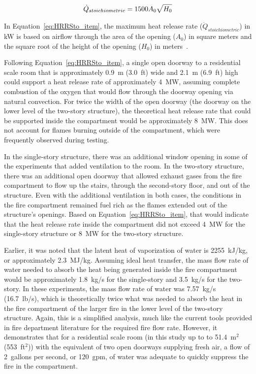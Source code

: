 \documentclass[12pt,oneside]{book}
\begin{document}
\begin{equation} \label{eq:HRRSto_item}
\dot{Q}_{stoichiometric} = 1500 A_0 \sqrt{H_0} \\
\end{equation}

In Equation~\ref{eq:HRRSto_item}, the maximum heat release rate ($\dot{Q}_{stoichiometric}$) in kW is based on airflow through the area of the opening ($A_0$) in square meters and the square root of the height of the opening ($H_0$) in meters~\cite{Babrauskas:4}.  

Following Equation~\ref{eq:HRRSto_item}, a single open doorway to a residential scale room that is approximately 0.9~m (3.0~ft) wide and 2.1~m (6.9~ft) high could support a heat release rate of approximately 4~MW, assuming complete combustion of the oxygen that would flow through the doorway opening via natural convection. For twice the width of the open doorway (the doorway on the lower level of the two-story structure), the theoretical heat release rate that could be supported inside the compartment would be approximately 8~MW. This does not account for flames burning outside of the compartment, which were frequently observed during testing.  

In the single-story structure, there was an additional window opening in some of the experiments that added ventilation to the room. In the two-story structure, there was an additional open doorway that allowed exhaust gases from the fire compartment to flow up the stairs, through the second-story floor, and out of the structure. Even with the additional ventilation in both cases, the conditions in the fire compartment remained fuel rich as the flames extended out of the structure's openings. Based on Equation~\ref{eq:HRRSto_item}, that would indicate that the heat release rate inside the compartment did not exceed 4~MW for the single-story structure or 8~MW for the two-story structure. 

Earlier, it was noted that the latent heat of vaporization of water is 2255~kJ/kg, or approximately 2.3~MJ/kg. Assuming ideal heat transfer, the mass flow rate of water needed to absorb the heat being generated inside the fire compartment would be approximately 1.8~kg/s for the single-story and 3.5~kg/s for the two-story. In these experiments, the mass flow rate of water was 7.57~kg/s (16.7~lb/s), which is theoretically twice what was needed to absorb the heat in the fire compartment of the larger fire in the lower level of the two-story structure. Again, this is a simplified analysis, much like the current tools provided in fire department literature for the required fire flow rate. However, it demonstrates that for a residential scale room (in this study up to to 51.4~m$^2$ (553~ft$^2$)) with the equivalent of two open doorways supplying fresh air, a flow of 2~gallons per second, or 120~gpm, of water was adequate to quickly suppress the fire in the compartment.                
\end{document}
